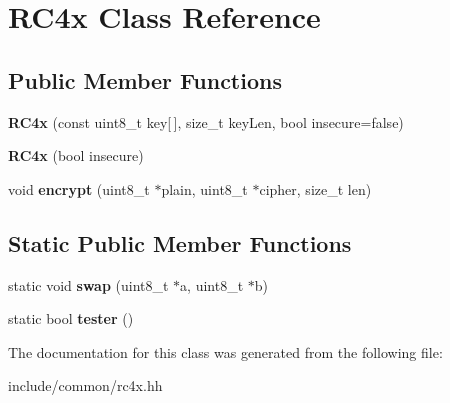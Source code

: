 \hypertarget{class_r_c4x}{}\section{R\+C4x Class Reference}
\label{class_r_c4x}
\subsection*{Public Member Functions}
\begin{DoxyCompactItemize}
\item 
\mbox{\label{class_r_c4x_ae8ee0e45fd0cbe51144a4340a91e48d3}} 
{\bfseries R\+C4x} (const uint8\+\_\+t key\mbox{[}$\,$\mbox{]}, size\+\_\+t key\+Len, bool insecure=false)
\item 
\mbox{\label{class_r_c4x_a889fd03744c8cab566c1ace81e6962bb}} 
{\bfseries R\+C4x} (bool insecure)
\item 
\mbox{\label{class_r_c4x_a920c11c785bbbfda295bc71953979b4c}} 
void {\bfseries encrypt} (uint8\+\_\+t $\ast$plain, uint8\+\_\+t $\ast$cipher, size\+\_\+t len)
\end{DoxyCompactItemize}
\subsection*{Static Public Member Functions}
\begin{DoxyCompactItemize}
\item 
\mbox{\label{class_r_c4x_ac1cb25922bdb2bc1e376babf0bd7c2e2}} 
static void {\bfseries swap} (uint8\+\_\+t $\ast$a, uint8\+\_\+t $\ast$b)
\item 
\mbox{\label{class_r_c4x_ae26a55256130ed43f815569113ec4d8b}} 
static bool {\bfseries tester} ()
\end{DoxyCompactItemize}


The documentation for this class was generated from the following file\+:\begin{DoxyCompactItemize}
\item 
include/common/rc4x.\+hh\end{DoxyCompactItemize}
